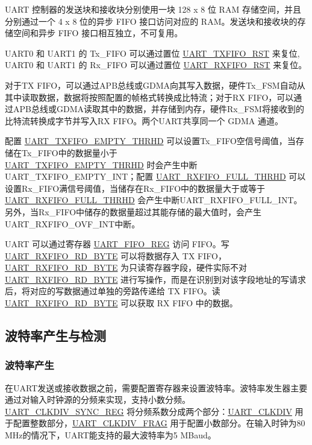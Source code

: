 \documentclass[main\_\_CN.tex]{subfiles}
\begin{document}
UART 控制器的发送块和接收块分别使用一块 128 x 8 位 RAM 存储空间，并且分别通过一个 4 x 8 位的异步 FIFO 接口访问对应的 RAM。发送块和接收块的存储空间和异步 FIFO 接口相互独立，不可复用。

UART0 和 UART1 的 Tx\_FIFO 可以通过置位 \hyperref[fielddesc:UARTTXFIFORST]{UART\_TXFIFO\_RST} 来复位, UART0 和 UART1 的 Rx\_FIFO 可以通过置位 \hyperref[fielddesc:UARTRXFIFORST]{UART\_RXFIFO\_RST} 来复位。

对于TX FIFO，可以通过APB总线或GDMA向其写入数据，硬件Tx\_FSM自动从其中读取数据，数据将按照配置的帧格式转换成比特流；对于RX FIFO，可以通过APB总线或GDMA读取其中的数据，并存储到内存，硬件Rx\_FSM将接收到的比特流转换成字节并写入RX FIFO。两个UART共享同一个 GDMA 通道。

配置 \hyperref[fielddesc:UARTTXFIFOEMPTYTHRHD]{UART\_TXFIFO\_EMPTY\_THRHD} 可以设置Tx\_FIFO空信号阈值，当存储在Tx\_FIFO中的数据量小于 \\\hyperref[fielddesc:UARTTXFIFOEMPTYTHRHD]{UART\_TXFIFO\_EMPTY\_THRHD} 时会产生中断UART\_TXFIFO\_EMPTY\_INT；配置 \hyperref[fielddesc:UARTRXFIFOFULLTHRHD]{UART\_RXFIFO\_FULL\_THRHD} 可以设置Rx\_FIFO满信号阈值，当储存在Rx\_FIFO中的数据量大于或等于 \hyperref[fielddesc:UARTRXFIFOFULLTHRHD]{UART\_RXFIFO\_FULL\_THRHD} 会产生中断UART\_RXFIFO\_FULL\_INT。另外，当Rx\_FIFO中储存的数据量超过其能存储的最大值时，会产生UART\_RXFIFO\_OVF\_INT中断。

UART 可以通过寄存器 \hyperref[regdesc:UARTFIFOREG]{UART\_FIFO\_REG} 访问 FIFO。写 \hyperref[fielddesc:UARTRXFIFORDBYTE]{UART\_RXFIFO\_RD\_BYTE} 可以将数据存入 TX FIFO，\hyperref[fielddesc:UARTRXFIFORDBYTE]{UART\_RXFIFO\_RD\_BYTE} 为只读寄存器字段，硬件实际不对 \hyperref[fielddesc:UARTRXFIFORDBYTE]{UART\_RXFIFO\_RD\_BYTE} 进行写操作，而是在识别到对该字段地址的写请求后，将对应的写数据通过单独的旁路传递给 TX FIFO。读 \hyperref[fielddesc:UARTRXFIFORDBYTE]{UART\_RXFIFO\_RD\_BYTE} 可以获取 RX FIFO 中的数据。

\subsection{波特率产生与检测}

\subsubsection{波特率产生}

在UART发送或接收数据之前，需要配置寄存器来设置波特率。波特率发生器主要通过对输入时钟源的分频来实现，支持小数分频。\hyperref[regdesc:UARTCLKDIVSYNCREG]{UART\_CLKDIV\_SYNC\_REG} 将分频系数分成两个部分：\hyperref[fielddesc:UARTCLKDIV]{UART\_CLKDIV} 用于配置整数部分，\hyperref[fielddesc:UARTCLKDIVFRAG]{UART\_CLKDIV\_FRAG} 用于配置小数部分。在输入时钟为80 MHz的情况下，UART能支持的最大波特率为5 MBaud。
\end{document}
